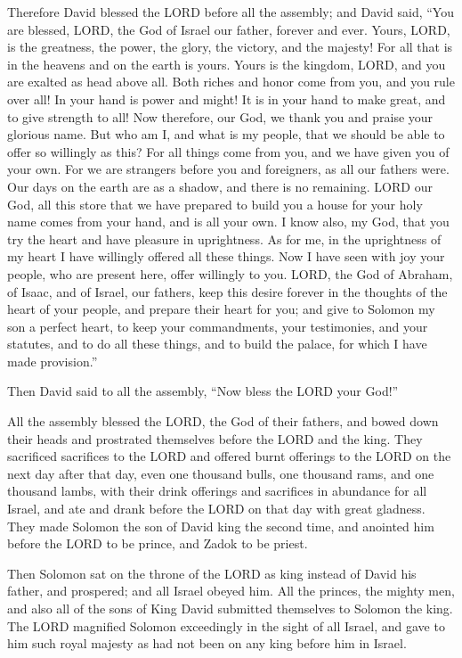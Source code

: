\myverse{}Therefore David blessed the LORD before all the assembly; and
David said, “You are blessed, LORD, the God of Israel our father, forever and ever.
\myverse{}Yours, LORD, is the greatness, the power, the glory, the victory, and the
majesty! For all that is in the heavens and on the earth is yours. Yours is the kingdom, LORD, and you
are exalted as head above all.
\myverse{}Both riches and honor come from you, and you rule over all! In your hand
is power and might! It is in your hand to make great, and to give strength to all!
\myverse{}Now therefore, our God, we thank you and praise your glorious name.
\myverse{}But who am I, and what is my people, that we should be able to offer so willingly
as this? For all things come from you, and we have given you of your own.
\myverse{}For we are strangers before you and foreigners, as all our fathers were.
Our days on the earth are as a shadow, and there is no remaining.
\myverse{}LORD our God, all this store that we have prepared to build you a house for
your holy name comes from your hand, and is all your own.
\myverse{}I know also, my God, that you try the heart and have pleasure in uprightness.
As for me, in the uprightness of my heart I have willingly offered all these things. Now I have seen with
joy your people, who are present here, offer willingly to you.
\myverse{}LORD, the God of Abraham, of Isaac, and of Israel, our fathers, keep this
desire forever in the thoughts of the heart of your people, and prepare their heart for you;
\myverse{}and give to Solomon my son a perfect heart, to keep your commandments, your
testimonies, and your statutes, and to do all these things, and to build the palace, for which I have
made provision.”

\myverse{}Then David said to all the assembly, “Now bless the LORD your
God!”

All the assembly blessed the LORD, the God of their fathers, and bowed down their heads and
prostrated themselves before the LORD and the king.
\myverse{}They sacrificed sacrifices to the LORD and offered burnt offerings to the
LORD on the next day after that day, even one thousand bulls, one thousand rams, and one thousand lambs,
with their drink offerings and sacrifices in abundance for all Israel,
\myverse{}and ate and drank before the LORD on that day with great gladness. They made
Solomon the son of David king the second time, and anointed him before the LORD to be prince, and Zadok
to be priest.

\myverse{}Then Solomon sat on the throne of the LORD as king instead of
David his father, and prospered; and all Israel obeyed him.
\myverse{}All the princes, the mighty men, and also all of the sons of King David submitted
themselves to Solomon the king.
\myverse{}The LORD magnified Solomon exceedingly in the sight of all Israel, and gave
to him such royal majesty as had not been on any king before him in Israel.


